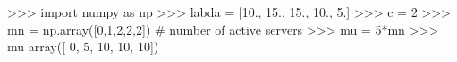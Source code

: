 
>>> import numpy as np
>>> labda = [10., 15., 15., 10., 5.]
>>> c = 2
>>> mn = np.array([0,1,2,2,2]) # number of active servers
>>> mu = 5*mn
>>> mu
array([ 0,  5, 10, 10, 10])

